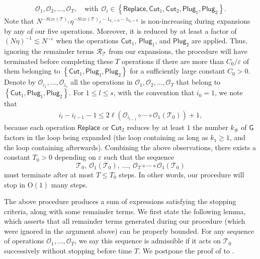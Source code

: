 \documentclass[10pt,reqno]{amsart}
\numberwithin{equation}{section}
\numberwithin{figure}{section}
\theoremstyle{plain} %
\theoremstyle{definition} %
\newcommand{\wt}{\widetilde}
\newcommand{\cT}{\mathcal T}
\newcommand{\cR}{{\mathcal R}}
\newcommand{\cO}{{\mathcal{O}}}
\newcommand{\sG}{\mathsf G}
\renewcommand{\leq}{\le}
\newcommand{\pa}[1]{\left({#1}\right)}
\newcommand{\ha}[1]{\left\{{#1}\right\}}
\newcommand{\tLambda}{{\wt{\Lambda}}}
\newcommand{\isize}{\mathit{Size}}
\newcommand{\sreplace}{\mathsf{Replace}}
\newcommand{\scut}[1]{\mathsf{Cut}_{#1}}
\newcommand{\splug}[1]{\mathsf{Plug}_{#1}}
\newcommand{\OO}{\mathrm{O}}
\newcommand{\tl}{\tLambda}
\newcommand{\mm}{\ell}
\numberwithin{equation}{section}
\begin{document}
    \begin{equation}\label{operation_sequence}
        \begin{aligned}
            \cO_1,\cO_2,\ldots,\cO_T,\quad \text{with}\ \ \cO_i\in \ha{\sreplace,\scut{1},\scut{2},\splug{1},\splug{2}}.
        \end{aligned}
    \end{equation}
    Note that $N^{-\isize\pa{\cT}_1}\eta^{-\isize\pa{\cT}_2-1_{k_1=0}-1_{k_2=0}}$ is non-increasing during expansions by any of our five operations. Moreover, it is reduced by at least a factor of $(N\eta)^{-1}\lesssim N^{-\varepsilon}$ when the operations $\scut{1}$, $\splug{1}$, and $\splug{2}$ are applied. 
    Thus, ignoring the remainder terms $\cR_\cT$ from our expansions, the procedure will have terminated before completing these $T$ operations if there are more than $C_0/\varepsilon$ of them belonging to $\ha{\scut{1},\splug{1},\splug{2}}$ for a sufficiently large constant $C_0>0$. 
    Denote by $\cO_{i_1},\ldots,\cO_{i_s}$ all the operations in $\cO_1,\cO_2,\ldots,\cO_T$ that belong to $\ha{\scut{1},\splug{1},\splug{2}}$. For $1\leq l\leq s$, with the convention that $i_0=1$, we note that
    \begin{equation}\nonumber
        \begin{aligned}
            i_l-i_{l-1}-1\leq 2\mm\pa{\cO_{i_{l-1}}\circ\cdots\circ\cO_1\pa{\cT_0}}+1,
        \end{aligned}
    \end{equation}
    because each operation $\sreplace$ or $\scut{2}$ reduces by at least $1$ the number $k_\#$ of $\sG$ factors in the loop being expanded (the loop containing \smash{$\tl_1$} as long as $k_1\ge 1$, and the loop containing \smash{$\tl_2$} afterwards). Combining the above observations, there exists a constant $T_0>0$ depending on $\varepsilon$ such that the sequence \[\cT_0,\ \cO_1\pa{\cT_0},\ \ldots, \ \cO_T\circ\cdots\circ\cO_1\pa{\cT_0}\] must terminate after at most $T\leq T_0$ steps. In other words, our procedure will stop in $\OO\pa{1}$ many steps.

    The above procedure produces a sum of expressions satisfying the stopping criteria, along with some remainder terms. We first state the following lemma, which asserts that all remainder terms generated during our procedure (which were ignored in the argument above) can be properly bounded. For any sequence of operations $\cO_1,\ldots,\cO_T$, we say this sequence is admissible if it acts on $\cT_0$ successively without stopping before time $T$. We postpone the proof of  to .
    
\end{document}
